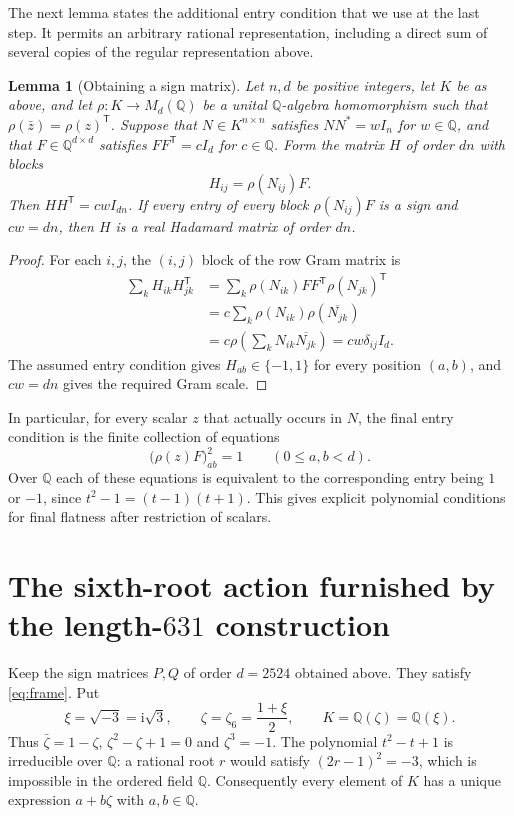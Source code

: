 \documentclass[10pt]{article}
\newtheorem{lemma}[theorem]{Lemma}
\newcommand{\Q}{\mathbb Q}
\begin{document}
The next lemma states the additional entry condition that we use at the
last step. It permits an arbitrary rational representation, including a
direct sum of several copies of the regular representation above.

\begin{lemma}[Obtaining a sign matrix]
\label{lem:sign-restriction}
Let $n,d$ be positive integers, let $K$ be as above, and let
$\rho:K\longrightarrow M_d(\Q)$ be a
unital $\Q$-algebra homomorphism such that
$\rho(\bar z)=\rho(z)^{\mathsf T}$. Suppose that $N\in K^{n\times n}$
satisfies $NN^*=wI_n$ for $w\in\Q$, and that $F\in\Q^{d\times d}$ satisfies
$FF^{\mathsf T}=cI_d$ for $c\in\Q$. Form the matrix $H$ of order $dn$ with blocks
\[
 H_{ij}=\rho(N_{ij})F.
\]
Then $HH^{\mathsf T}=cwI_{dn}$. If every entry of every block
$\rho(N_{ij})F$ is a sign and $cw=dn$, then $H$ is a real Hadamard
matrix of order $dn$.
\end{lemma}

\begin{proof}
For each $i,j$, the $(i,j)$ block of the row Gram matrix is
\begin{align*}
 \sum_k H_{ik}H_{jk}^{\mathsf T}
 &=\sum_k\rho(N_{ik})FF^{\mathsf T}\rho(N_{jk})^{\mathsf T}\\
 &=c\sum_k\rho(N_{ik})\rho(\overline{N_{jk}})\\
 &=c\rho\!\left(\sum_kN_{ik}\overline{N_{jk}}\right)
 =cw\delta_{ij}I_d.
\end{align*}
The assumed entry condition gives $H_{ab}\in\{-1,1\}$ for every
position $(a,b)$, and $cw=dn$ gives the required Gram scale.
\end{proof}

In particular, for every scalar $z$ that actually occurs in $N$, the
final entry condition is the finite collection of equations
\[
 \bigl(\rho(z)F\bigr)_{ab}^{2}=1
       \qquad(0\leq a,b<d).
\]
Over $\Q$ each of these equations is equivalent to the corresponding
entry being $1$ or $-1$, since $t^2-1=(t-1)(t+1)$. This gives explicit
polynomial conditions for final flatness after restriction of scalars.

\section{The sixth-root action furnished by the \texorpdfstring{length-$631$}{length-631} construction}
\label{sec:sixth-root-action}

Keep the sign matrices $P,Q$ of order $d=2524$ obtained above. They
satisfy \eqref{eq:frame}. Put
\[
 \xi=\sqrt{-3}=\mathrm i\sqrt3,\qquad
 \zeta=\zeta_6=\frac{1+\xi}{2},\qquad
 K=\Q(\zeta)=\Q(\xi).
\]
Thus $\bar\zeta=1-\zeta$, $\zeta^2-\zeta+1=0$ and $\zeta^3=-1$.
The polynomial $t^2-t+1$ is irreducible over $\Q$: a rational root
$r$ would satisfy $(2r-1)^2=-3$, which is impossible in the ordered
field $\Q$. Consequently every element of $K$ has a unique expression
$a+b\zeta$ with $a,b\in\Q$.
\end{document}

